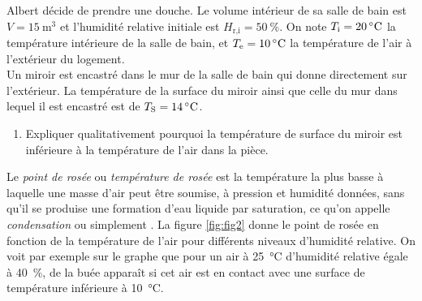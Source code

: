 \documentclass[a4paper,french,bookmarks]{article}
\begin{document}
Albert décide de prendre une douche. Le volume intérieur de sa salle de bain est $V = \SI{15}{\m^3}$ et l'humidité relative initiale est $H_\text {r,i} = \SI{50}{\percent}$. On note $T_\text i = \SI{20}{\celsius}$ la température intérieure de la salle de bain, et $T_\text e = \SI{10}{\celsius}$ la température de l'air à l'extérieur du logement.\\[2pt]
%
Un miroir est encastré dans le mur de la salle de bain qui donne directement sur l'extérieur. La température de la surface du miroir ainsi que celle du mur dans lequel il est encastré est de $T_\text S = \SI{14}{\celsius}$.

\begin{enumerate}[resume]
    \item Expliquer qualitativement pourquoi la température de surface du miroir est inférieure à la température de l'air dans la pièce.
    
\end{enumerate}

Le \textit{point de rosée} ou \textit{température de rosée} est la température la plus basse à laquelle une masse d'air peut être soumise, à pression et humidité données, sans qu'il se produise une formation d'eau liquide par saturation, ce qu'on appelle \textit{condensation} ou simplement . La figure \ref{fig:fig2} donne le point de rosée en fonction de la température de l'air pour différents niveaux d'humidité relative. On voit par exemple sur le graphe que pour un air à \SI{25}{\celsius} d'humidité relative égale à \SI{40}{\percent}, de la buée apparaît si cet air est en contact avec une surface de température inférieure à \SI{10}{\celsius}.
\end{document}

